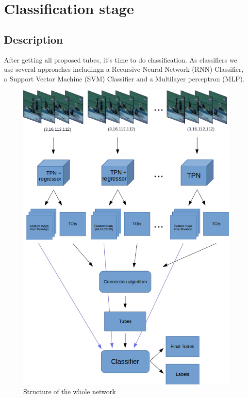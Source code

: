 \documentclass{report}
\begin{document}
\chapter{Classification stage}
\section{Description}
After getting all proposed tubes, it's time to do classification. As classifiers we use several approaches includingn
a Recursive Neural Network (RNN) Classifier, a Support Vector Machine (SVM) Classifier and a Multilayer perceptron (MLP).

\begin{figure}[h]
  \centering
  \includegraphics[scale=0.42]{model_prenms}
  \caption{Structure of the whole network}
  \label{fig:whole_network}
\end{figure}
\end{document}
